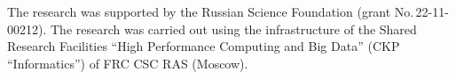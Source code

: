 {\Ack

\vspace*{-5pt}

\noindent
The research was supported by the Russian Science Foundation (grant No.\,22-11-00212). The
 research was carried out using the infrastructure of the Shared Research Facilities ``High 
Performance Computing and Big Data'' (CKP ``Informatics'') of FRC CSC RAS (Moscow). 




\vspace*{6pt}

  \begin{multicols}{2}

\renewcommand{\bibname}{\protect\rmfamily References}

{\small\frenchspacing
 {%
 
 \begin{thebibliography}{99}
 
 \vspace*{-3pt}
 

\end{thebibliography}}}
\end{multicols}}
